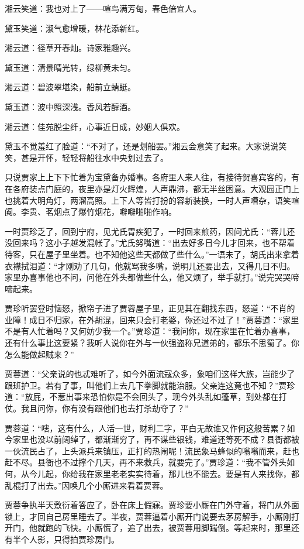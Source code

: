 \documentclass[12pt,oneside]{book}
\begin{document}
湘云笑道：我也对上了——喧鸟满芳甸，春色倍宜人。

黛玉笑道：淑气愈增暖，林花添新红。

湘云道：径草开春灿。诗家雅趣兴。

黛玉道：清景晴光转，绿柳黄未匀。

湘云道：碧波翠堪染，船前立蜻蜓。

黛玉道：波中照深浅。香风若醇酒。

湘云道：佳苑脱尘纤，心事近日成，妙姻人俱欢。

黛玉不觉羞红了脸道：“不对了，还是划船罢。”湘云会意笑了起来。大家说说笑笑，甚是开怀，轻轻将船往水中央划过去了。

只说贾家上上下下忙着为宝黛备办婚事。各府里人来人往，有接待贺喜宾客的，有在各府装点门庭的，夜里亦是灯火辉煌，人声鼎沸，都无半丝困意。大观园正门上也挑着大明角灯，两溜高照。上下人等皆打扮的容新装换，一时人声嘈杂，语笑喧阗。李贵、茗烟点了爆竹烟花，噼噼啪啪作响。

一时贾珍乏了，回到宁府，见尤氏胃疾犯了，一时回来煎药，因问尤氏：“蓉儿还没回来吗？这小子越发混帐了。”尤氏努嘴道：“出去好多日今儿才回来，也不帮着待客，只在屋子里坐着。也不知他这些天都做了些什么。”一语未了，胡氏出来拿着衣襟拭泪道：“才刚劝了几句，他就骂我多嘴，说明儿还要出去，又得几日不归。家里办喜事他也不问，问他在外头都做些什么，他又烦了，举手就打。”说完哭哭啼啼起来。

贾珍听罢登时恼怒，掀帘子进了贾蓉屋子里，正见其在翻找东西，怒道：“不肖的业障！成日不归家，在外胡混，回来只会打老婆，你还过不过了！”贾蓉道：“家里不是有人忙着吗？又何妨少我一个。”贾珍道：“我问你，现在家里在忙着办喜事，还有什么事比这要紧？我听人说你在外与一伙强盗称兄道弟的，都乐不思蜀了。你怎么能做起贼来？”

贾蓉道：“父亲说的也忒难听了，如今外面流寇众多，象咱们这样大族，岂能少了跟班护卫。若有了事，叫他们上去几下拳脚就能治服。父亲连这竟也不知？”贾珍道：“放屁，不惹出事来恐怕你是不会回头了，现今外头乱如蓬草，到处都在打仗。我且问你，你有没有跟他们也去打杀劫夺了？”

贾蓉道：“嗐，这有什么，人活一世，财利二字，平白无故谁又作何这般苦累？如今家里也没以前阔绰了，都渐渐穷了，再不谋些银钱，难道还等死不成？县衙都被一伙流民占了，上头派兵来镇压，正打的热闹呢！流民象马蜂似的嗡嗡而来，赶也赶不尽。县衙也不过撑个几天，再不来救兵，就要完了。”贾珍道：“我不管外头如何，从今儿起，你给我在家里老老实实待着，那儿也不能去。要是有人来找你，都乱棍打了出去。”因唤几个小厮进来看着贾蓉。

贾蓉争执半天敷衍着答应了，卧在床上假寐。贾珍要小厮在门外守着，将门从外面锁上，才回自己房里睡去了。半夜，贾蓉逼着小厮开门说要去茅房解手，小厮刚打开门，他就跑的飞快。小厮慌了，追了出去，被贾蓉用脚踹倒。等起来时，那里还有半个人影，只得拍贾珍房门。
\end{document}
